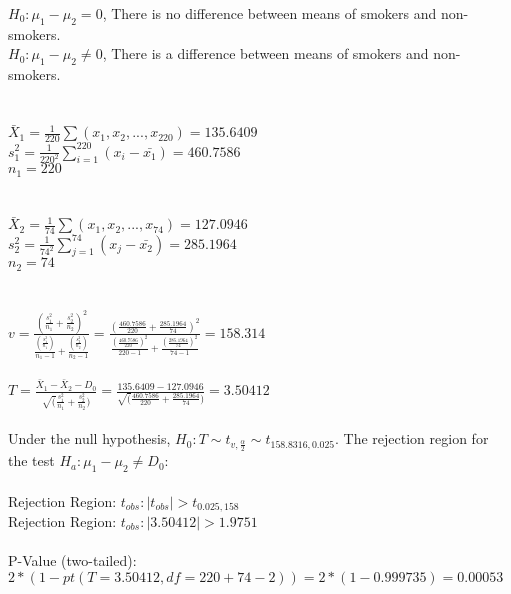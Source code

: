 \documentclass[
]{article}
\begin{document}
\(H_{0}: \mu_{1}-\mu_{2} = 0\), There is no difference between means of
smokers and non-smokers.\\
\(H_{0}: \mu_{1}-\mu_{2} ≠ 0\), There is a difference between means of
smokers and non-smokers.\\
~\\
~\\
\(\bar{X}_{1} = \frac{1}{220}\sum(x_{1},x_{2},...,x_{220}) = 135.6409\)\\
\(s^2_{1} = \frac{1}{220^2}\sum^{220}_{i=1}(x_{i}-\bar{x_{1}}) = 460.7586\)\\
\(n_{1} = 220\)\\
~\\
~\\
\(\bar{X}_{2} = \frac{1}{74}\sum(x_{1},x_{2},...,x_{74}) = 127.0946\)\\
\(s^2_{2} = \frac{1}{74^2}\sum^{74}_{j=1}(x_{j}-\bar{x_{2}}) = 285.1964\)\\
\(n_{2} = 74\)\\
~\\
~\\
\(v = \frac{(\frac{s^2_{1}}{n_{1}}+\frac{s^2_{2}}{n_{2}})^2}{\frac{(\frac{s^2_{1}}{n_{1}})}{n_{1}-1}+{\frac{(\frac{s^2_{2}}{n_{2}})}{n_{2}-1}}} = \frac{(\frac{460.7586}{220}+\frac{285.1964}{74})^2}{\frac{(\frac{460.7586}{220})^2}{220-1}+{\frac{(\frac{285.1964}{74})^2}{74-1}}} = 158.314\)\\
~\\
\(T = \frac{\bar{X}_1-\bar{X}_2-D_{0}}{\sqrt(\frac{s^2_1}{n_{1}}+\frac{s^2_2}{n_{2}})} = \frac{135.6409-127.0946}{\sqrt(\frac{460.7586}{220}+\frac{285.1964}{74})} = 3.50412\)\\
~\\
Under the null hypothesis,
\(H_{0}: T \sim t_{v,\frac{\alpha}{2}} \sim t_{158.8316,0.025}\). The
rejection region for the test \(H_{a}: \mu_{1}-\mu_{2} ≠ D_{0}:\)\\
~\\

Rejection Region: \({t_{obs} : |t_{obs}| > t_{0.025,158}}\)\\

Rejection Region: \({t_{obs} : |3.50412| > 1.9751}\)\\
~\\

P-Value (two-tailed):\\
\(2*(1-pt(T = 3.50412,df = 220+74-2)) = 2*(1-0.999735) = 0.00053\)\\
~\\
\end{document}
